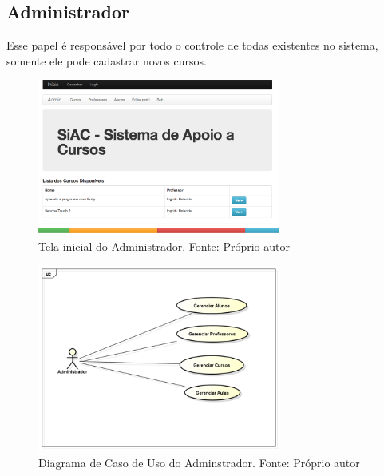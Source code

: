 \documentclass[pnumabnt,normaltoc,espacoumemeio,capchap]{abnt}
\begin{document}
\subsection{Administrador}
\par Esse papel é responsável por todo o controle de todas existentes no sistema, somente ele pode cadastrar novos cursos.
\begin{figure}[htbp]
	\centering
	\caption{Tela inicial do Administrador\label{fig:tela-adm}. Fonte: Próprio autor}
	\includegraphics[width=8cm,scale=1]{images/tela-adm.png}
\end{figure}
\begin{figure}[htbp]
	\centering
	\caption{Diagrama de Caso de Uso do Adminstrador\label{fig:dia-adm}. Fonte: Próprio autor}
	\includegraphics[width=8cm,scale=1]{images/dia-adm.png}
\end{figure}
 
\end{document}
